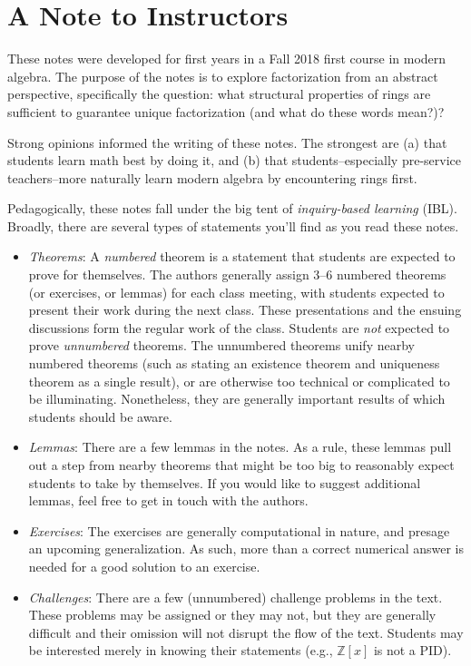 \documentclass[english,course]{lecture}
\theoremstyle{plain}
\def\Z{{\mathbb Z}}
\begin{document}
\clearpage

\section*{A Note to Instructors}

These notes were developed for first years in a Fall 2018 first course in modern algebra. The purpose of the notes is to explore factorization from an abstract perspective, specifically the question: what structural properties of rings are sufficient to guarantee unique factorization (and what do these words mean?)?

Strong opinions informed the writing of these notes. The strongest are (a) that students learn math best by doing it, and (b) that students--especially pre-service teachers--more naturally learn modern algebra by encountering rings first.

Pedagogically, these notes fall under the big tent of \emph{inquiry-based learning} (IBL). Broadly, there are several types of statements you'll find as you read these notes.

\begin{itemize}
	\item \emph{Theorems}: A \emph{numbered} theorem is a statement that students are expected to prove for themselves. The authors generally assign 3--6 numbered theorems (or exercises, or lemmas) for each class meeting, with students expected to present their work during the next class. These presentations and the ensuing discussions form the regular work of the class. Students are \emph{not} expected to prove \emph{unnumbered} theorems. The unnumbered theorems unify nearby numbered theorems (such as stating an existence theorem and uniqueness theorem as a single result), or are otherwise too technical or complicated to be illuminating. Nonetheless, they are generally important results of which students should be aware.
	\item \emph{Lemmas}: There are a few lemmas in the notes. As a rule, these lemmas pull out a step from nearby theorems that might be too big to reasonably expect students to take by themselves. If you would like to suggest additional lemmas, feel free to get in touch with the authors.
	\item \emph{Exercises}: The exercises are generally computational in nature, and presage an upcoming generalization. As such, more than a correct numerical answer is needed for a good solution to an exercise.
	\item \emph{Challenges}: There are a few (unnumbered) challenge problems in the text. These problems may be assigned or they may not, but they are generally difficult and their omission will not disrupt the flow of the text. Students may be interested merely in knowing their statements (e.g., $\Z[x]$ is not a PID).
\end{itemize} 
\end{document}
